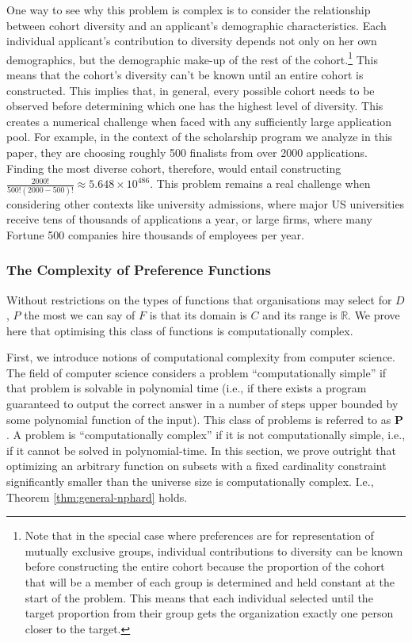 One way to see why this problem is complex is to consider the relationship between cohort diversity and an applicant's demographic characteristics. Each individual applicant's contribution to diversity depends not only on her own demographics, but the demographic make-up of the rest of the cohort.\footnote{Note that in the special case where preferences are for representation of mutually exclusive groups, individual contributions to diversity can be known before constructing the entire cohort because the proportion of the cohort that will be a member of each group is determined and held constant at the start of the problem. This means that each individual selected until the target proportion from their group gets the organization exactly one person closer to the target.} This means that the cohort's diversity can't be known until an entire cohort is constructed. This implies that, in general, every possible cohort needs to be observed before determining which one has the highest level of diversity. This creates a numerical challenge when faced with any sufficiently large application pool. For example, in the context of the scholarship program we analyze in this paper, they are choosing roughly 500 finalists from over 2000 applications. Finding the most diverse cohort, therefore, would entail constructing $\frac{2000!}{500!(2000-500)!} \approx 5.648\times10^{486}$. This problem remains a real challenge when considering other contexts like university admissions, where major US universities receive tens of thousands of applications a year, or large firms, where many Fortune 500 companies hire thousands of employees per year.  

\subsubsection{The Complexity of Preference Functions}\label{subsubsec:proof_nphard}

Without restrictions on the types of functions that organisations may select for $D$, $P$ the most we can say of $F$ is that its domain is $C$ and its range is $\mathbb{R}$. We prove here that optimising this class of functions is computationally complex.

First, we introduce notions of computational complexity from computer science. The field of computer science considers a problem ``computationally simple'' if that problem is solvable in polynomial time (i.e., if there exists a program guaranteed to output the correct answer in a number of steps upper bounded by some polynomial function of the input). This class of problems is referred to as $\mathbf{P}$. A problem is ``computationally complex'' if it is not computationally simple, i.e., if it cannot be solved in polynomial-time. In this section, we prove outright that optimizing an arbitrary function on subsets with a fixed cardinality constraint significantly smaller than the universe size is computationally complex. I.e., Theorem \ref{thm:general-nphard} holds.

